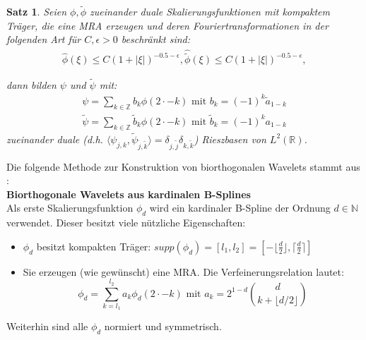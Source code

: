 \documentclass[11pt,a4paper,titlepage]{article}
\theoremstyle{plain} %
\newtheorem{satz}{Satz}[section] %
\newcommand{\skalar}[2]{\langle #1, #2\rangle}
\theoremstyle{definition} %
\numberwithin{equation}{section} %
\begin{document}
		\begin{satz}
			Seien $\phi, \tilde{\phi}$ zueinander duale Skalierungsfunktionen mit kompaktem Träger, die eine MRA erzeugen und deren Fouriertransformationen in der folgenden Art für $C,\epsilon>0$ beschränkt sind: 
			\begin{align}
			\hat{\phi}(\xi)\leq C(1+|\xi|)^{-0.5-\epsilon}, \hat{\tilde{\phi}}(\xi)\leq C(1+|\xi|)^{-0.5-\epsilon}, 
			\end{align}
			
			dann bilden $\psi$ und $\tilde{\psi}$ mit:
				\begin{align}
				\psi = \sum_{k\in \mathbb{Z}}b_k \phi(2\cdot-k) \text{ mit } b_k=(-1)^k \tilde{a}_{1-k}\\
				\tilde{\psi} = \sum_{k\in \mathbb{Z}}\tilde{b}_k \phi(2\cdot-k) \text{ mit } \tilde{b}_k=(-1)^k a_{1-k}
				\end{align}
			zueinander duale  (d.h. $\skalar{\psi_{j,k}}{\tilde{\psi}_{\tilde{j},\tilde{k}}}=\delta_{j,\tilde{j}}\delta_{k,\tilde{k}}$) Rieszbasen von $L^2(\mathbb{R})$.
		\end{satz}
		
		Die folgende Methode zur Konstruktion von biorthogonalen Wavelets stammt aus \cite{CohenDaubechiesFeauveau}:\\
		
		\textbf{Biorthogonale Wavelets aus kardinalen B-Splines}\\
			Als erste Skalierungsfunktion $\phi_d$ wird ein kardinaler B-Spline der Ordnung $d\in \mathbb{N}$ verwendet. Dieser besitzt viele nützliche Eigenschaften: 
		\begin{itemize}
			\item $\phi_d$ besitzt kompakten Träger: $supp(\phi_d)=[l_1,l_2]=[-\lfloor \frac{d}{2} \rfloor, \lceil \frac{d}{2} \rceil]$
			\item Sie erzeugen (wie gewünscht) eine MRA. Die Verfeinerungsrelation lautet:
				\begin{equation}
					 \phi_d = \sum_{k=l_1}^{l_2} a_k \phi_d(2\cdot -k)  \text{ mit } a_k=2^{1-d} \binom{d}{k+\lfloor d/2 \rfloor} 
				\end{equation} 
		\end{itemize}
		
		Weiterhin sind alle $\phi_d$ normiert und symmetrisch. 
		
\end{document}
